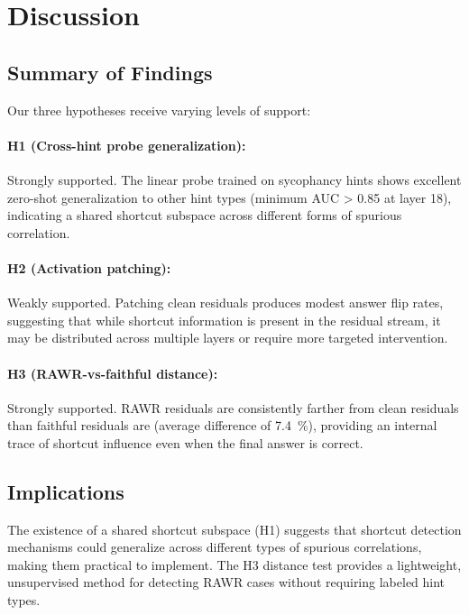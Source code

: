 \section{Discussion}
\label{sec:discussion}

\subsection{Summary of Findings}
Our three hypotheses receive varying levels of support:

\paragraph{H1 (Cross-hint probe generalization):} Strongly supported. The linear probe trained on sycophancy hints shows excellent zero-shot generalization to other hint types (minimum AUC > \num{0.85} at layer \num{18}), indicating a shared shortcut subspace across different forms of spurious correlation.

\paragraph{H2 (Activation patching):} Weakly supported. Patching clean residuals produces modest answer flip rates, suggesting that while shortcut information is present in the residual stream, it may be distributed across multiple layers or require more targeted intervention.

\paragraph{H3 (RAWR-vs-faithful distance):} Strongly supported. RAWR residuals are consistently farther from clean residuals than faithful residuals are (average difference of \qty{7.4}{\percent}), providing an internal trace of shortcut influence even when the final answer is correct.

\subsection{Implications}
The existence of a shared shortcut subspace (H1) suggests that shortcut detection mechanisms could generalize across different types of spurious correlations, making them practical to implement. The H3 distance test provides a lightweight, unsupervised method for detecting RAWR cases without requiring labeled hint types.


